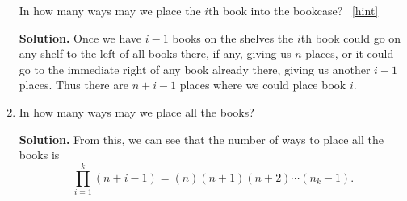 \documentclass{book}
\begin{document}
\begin{activity}[]
\begin{enumerate}[font=\bfseries,label=(\alph*),ref=\alph*]
In how many ways may we place the \(i\)th book into the bookcase?%
~\hfill{\tiny\hyperlink{a-124.e}{[hint]}\hypertarget{q-124.e}{}}\par\smallskip%
\noindent\textbf{Solution.}\hypertarget{solution-94}{}\quad%
\hypertarget{p-883}{}%
Once we have \(i-1\) books on the shelves the \(i\)th book could go on any shelf to the left of all books there, if any, giving us \(n\) places, or it could go to the immediate right of any book already there, giving us another \(i-1\) places. Thus there are \(n+i-1\) places where we could place book  \(i\).%
\item\label{task-169} \hypertarget{p-884}{}%
In how many ways may we place all the books?%
\par\smallskip%
\noindent\textbf{Solution.}\hypertarget{solution-95}{}\quad%
\hypertarget{p-885}{}%
From this, we can see that the number of ways to place all the books is%
\begin{equation*}
\prod_{i=1}^k (n+i-1) = (n)(n+1)(n+2)\cdots(n_k-1).
\end{equation*}
%
\end{enumerate}
\end{activity}
\end{document}
